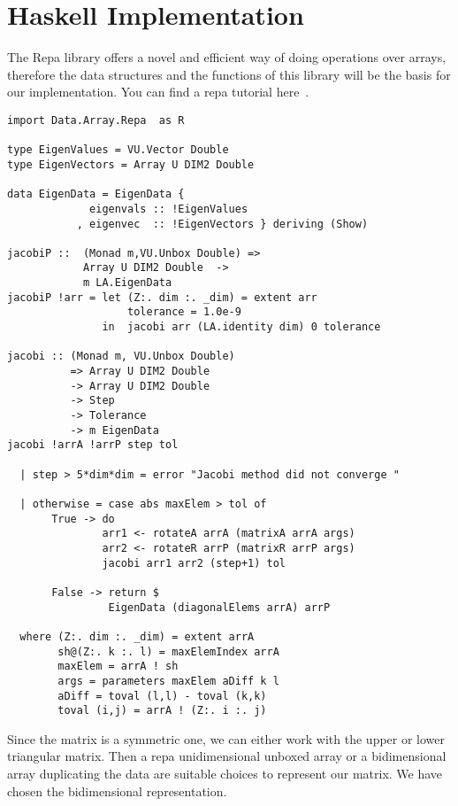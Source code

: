 \documentclass{tmr}
\begin{document}
\section{Haskell Implementation} 
The Repa library offers a novel and efficient
way of doing operations over arrays, therefore the data structures
and the functions of this library will be the basis for our 
implementation. You can find a repa tutorial here~\cite{repa}.

\begin{lstlisting}[float,captionpos=b,belowcaptionskip=4pt, caption= Jacobi Method]
import Data.Array.Repa  as R

type EigenValues = VU.Vector Double
type EigenVectors = Array U DIM2 Double

data EigenData = EigenData {
             eigenvals :: !EigenValues
           , eigenvec  :: !EigenVectors } deriving (Show)

jacobiP ::  (Monad m,VU.Unbox Double) =>
            Array U DIM2 Double  ->
            m LA.EigenData
jacobiP !arr = let (Z:. dim :. _dim) = extent arr
                   tolerance = 1.0e-9
               in  jacobi arr (LA.identity dim) 0 tolerance

jacobi :: (Monad m, VU.Unbox Double)
          => Array U DIM2 Double
          -> Array U DIM2 Double
          -> Step
          -> Tolerance
          -> m EigenData
jacobi !arrA !arrP step tol

  | step > 5*dim*dim = error "Jacobi method did not converge "

  | otherwise = case abs maxElem > tol of
       True -> do
               arr1 <- rotateA arrA (matrixA arrA args)
               arr2 <- rotateR arrP (matrixR arrP args)
               jacobi arr1 arr2 (step+1) tol

       False -> return $
                EigenData (diagonalElems arrA) arrP

  where (Z:. dim :. _dim) = extent arrA
        sh@(Z:. k :. l) = maxElemIndex arrA
        maxElem = arrA ! sh
        args = parameters maxElem aDiff k l
        aDiff = toval (l,l) - toval (k,k)
        toval (i,j) = arrA ! (Z:. i :. j)
\end{lstlisting}

Since the matrix is a symmetric one, we can either work with the upper or lower
triangular matrix. Then a repa unidimensional unboxed array or a bidimensional array
 duplicating the data are suitable choices to represent our matrix. 
We have chosen the bidimensional representation.
\end{document}
